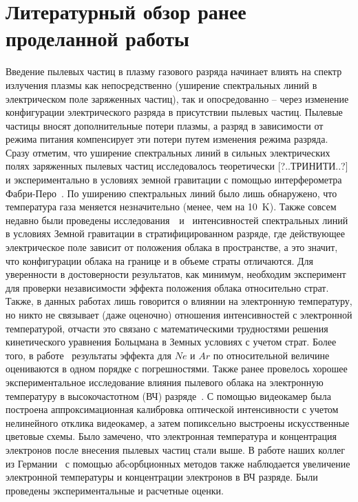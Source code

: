 \section{Литературный обзор ранее проделанной работы}
Введение пылевых частиц в плазму газового разряда начинает влиять на спектр излучения плазмы как
непосредственно (уширение спектральных линий в электрическом поле заряженных частиц),
так и опосредованно – через изменение конфигурации электрического разряда в присутствии пылевых частиц.
Пылевые частицы вносят дополнительные потери плазмы, а разряд в зависимости от режима питания компенсирует
эти потери путем изменения режима разряда. Сразу отметим, что уширение спектральных линий в сильных
электрических полях заряженных пылевых частиц исследовалось теоретически [?..ТРИНИТИ..?] и экспериментально в условиях
земной гравитации с помощью интерферометра Фабри-Перо~\cite{Pikalev2014}. По уширению спектральных линий было лишь обнаружено, что
температура газа меняется незначительно (менее, чем на 10~K).
Также совсем недавно были проведены исследования~\cite{Pikalev2018}~и~\cite{Kostenko} интенсивностей спектральных линий в условиях
Земной гравитации в стратифицированном разряде, где действующее электрическое поле зависит от
положения облака в пространстве, а это значит, что конфигурации облака на границе и в объеме страты отличаются.
Для уверенности в достоверности результатов, как минимум, необходим эксперимент для проверки независимости эффекта
положения облака относительно страт. Также, в данных работах лишь говорится о влиянии на электронную температуру, но никто
не связывает (даже оценочно) отношения интенсивностей с электронной температурой, отчасти это связано с математическими
трудностями решения кинетического уравнения Больцмана в Земных условиях с учетом страт. Более того, в работе~\cite{Pikalev2018}
результаты эффекта для $Ne$ и $Ar$ по относительной величине оцениваются в одном порядке с погрешностями.
Также ранее провелось хорошее экспериментальное исследование влияния пылевого облака на электронную температуру в
высокочастотном (ВЧ) разряде~\cite{Samsonov1999}. С помощью видеокамер была построена аппроксимационная калибровка
оптической интенсивности с учетом нелинейного отклика видеокамер, а затем попиксельно выстроены искусственные
цветовые схемы. Было замечено, что электронная температура и концентрация электронов после внесения пылевых частиц стали выше.
В работе наших коллег из Германии~\cite{Mitic2009} с помощью абcорбционных методов также наблюдается увеличение
электронной температуры и концентрации электронов в ВЧ разряде. Были проведены экспериментальные и расчетные оценки.

